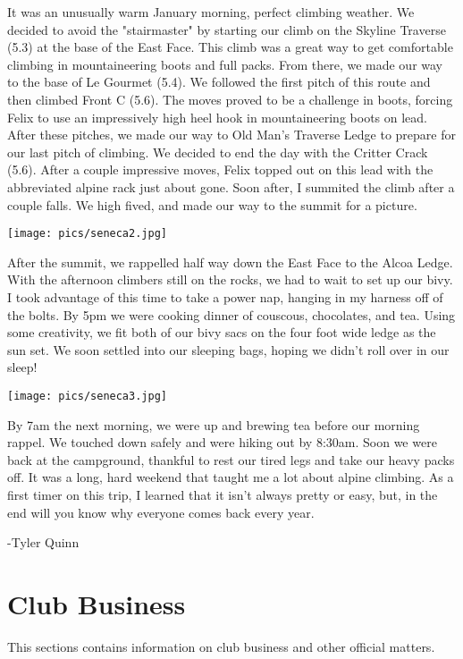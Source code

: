 \documentclass[10pt,a4paper]{article}
\newcommand\sect[1]{%
  \section*{#1}%
  \addcontentsline{toc}{section}{#1}}
\newenvironment{Figure}
  {\par\medskip\noindent\minipage{\linewidth}}
  {\endminipage\par\medskip}
\begin{document}
\begin{multicols}{2}
It was an unusually warm January morning, perfect climbing weather. We decided to avoid the "stairmaster" by starting our climb on the Skyline Traverse (5.3) at the base of the East Face. This climb was a great way to get comfortable climbing in mountaineering boots and full packs. From there, we made our way to the base of Le Gourmet (5.4). We followed the first pitch of this route and then climbed Front C (5.6). The moves proved to be a challenge in boots, forcing Felix to use an impressively high heel hook in mountaineering boots on lead. After these pitches, we made our way to Old Man's Traverse Ledge to prepare for our last pitch of climbing. We decided to end the day with the Critter Crack (5.6). After a couple impressive moves, Felix topped out on this lead with the abbreviated alpine rack just about gone. Soon after, I summited the climb after a couple falls. We high fived, and made our way to the summit for a picture.

\begin{Figure}
 \centering
 \texttt{[image: pics/seneca2.jpg]}
\end{Figure}

After the summit, we rappelled half way down the East Face to the Alcoa Ledge. With the afternoon climbers still on the rocks, we had to wait to set up our bivy. I took advantage of this time to take a power nap, hanging in my harness off of the bolts. By 5pm we were cooking dinner of couscous, chocolates, and tea. Using some creativity, we fit both of our bivy sacs on the four foot wide ledge as the sun set.   We soon settled into our sleeping bags, hoping we didn't roll over in our sleep!
\begin{Figure}
 \centering
 \texttt{[image: pics/seneca3.jpg]}
\end{Figure}


By 7am the next morning, we were up and brewing tea before our morning rappel. We touched down safely and were hiking out by 8:30am. Soon we were back at the campground, thankful to rest our tired legs and take our heavy packs off. It was a long, hard weekend that taught me a lot about alpine climbing. As a first timer on this trip, I learned that it isn't always pretty or easy, but, in the end will you know why everyone comes back every year.


-Tyler Quinn

\pagebreak

\sect{Club Business}
This sections contains information on club business and other official matters. 


\end{multicols}
\end{document}
